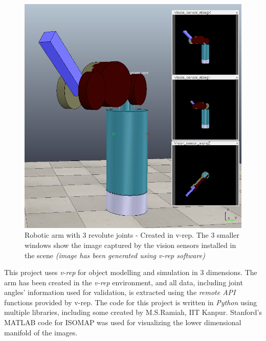 \documentclass[12pt, two column]{article}
\begin{document}
\begin{figure}[h]
  \includegraphics[width=\columnwidth]{graphics/3dof}
  \caption{Robotic arm with 3 revolute joints - Created in v-rep. The 3 smaller windows show the image captured by the vision sensors installed in the scene \textit{\small{(image has been generated using v-rep software)}}}
  \label{3dof}
\end{figure}

This project uses \textit{v-rep} for object modelling and simulation in 3 dimensions. The arm has been created in the \textit{v-rep} environment, and all data, including joint angles' information used for validation, is extracted using the \textit{remote API} functions provided by v-rep. The code for this project is written in \textit{Python} using multiple libraries, including some created by M.S.Ramiah, IIT Kanpur. Stanford's MATLAB code for ISOMAP was used for visualizing the lower dimensional manifold of the images.
\end{document}
